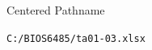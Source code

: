 \documentclass[14pt,t]{beamer-accessibility}
\begin{document}
\begin{frame}{Centered Pathname}
\begin{center}
\texttt{C:/BIOS6485/ta01-03.xlsx}
\end{center}
\end{frame}
\end{document}
